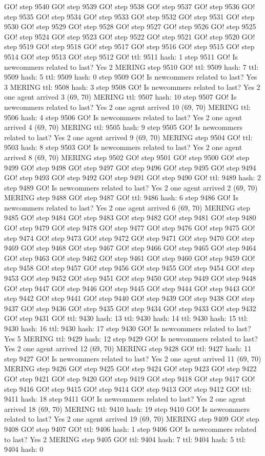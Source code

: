 GO! step 9540 GO! step 9539 GO! step 9538 GO! step 9537 GO! step 9536 GO! step 9535 GO! step 9534 GO! step 9533 GO! step 9532 GO! step 9531 GO! step 9530 GO! step 9529 GO! step 9528 GO! step 9527 GO! step 9526 GO! step 9525 GO! step 9524 GO! step 9523 GO! step 9522 GO! step 9521 GO! step 9520 GO! step 9519 GO! step 9518 GO! step 9517 GO! step 9516 GO! step 9515 GO! step 9514 GO! step 9513 GO! step 9512 GO! ttl: 9511 hash: 1 step 9511 GO! Is newcommers related to last? Yes 2 MERING step 9510 GO! ttl: 9509 hash: 7 ttl: 9509 hash: 5 ttl: 9509 hash: 0 step 9509 GO! Is newcommers related to last? Yes 3 MERING ttl: 9508 hash: 3 step 9508 GO! Is newcommers related to last? Yes 2 one agent arrived 3 (69, 70) MERING ttl: 9507 hash: 10 step 9507 GO! Is newcommers related to last? Yes 2 one agent arrived 10 (69, 70) MERING ttl: 9506 hash: 4 step 9506 GO! Is newcommers related to last? Yes 2 one agent arrived 4 (69, 70) MERING ttl: 9505 hash: 9 step 9505 GO! Is newcommers related to last? Yes 2 one agent arrived 9 (69, 70) MERING step 9504 GO! ttl: 9503 hash: 8 step 9503 GO! Is newcommers related to last? Yes 2 one agent arrived 8 (69, 70) MERING step 9502 GO! step 9501 GO! step 9500 GO! step 9499 GO! step 9498 GO! step 9497 GO! step 9496 GO! step 9495 GO! step 9494 GO! step 9493 GO! step 9492 GO! step 9491 GO! step 9490 GO! ttl: 9489 hash: 2 step 9489 GO! Is newcommers related to last? Yes 2 one agent arrived 2 (69, 70) MERING step 9488 GO! step 9487 GO! ttl: 9486 hash: 6 step 9486 GO! Is newcommers related to last? Yes 2 one agent arrived 6 (69, 70) MERING step 9485 GO! step 9484 GO! step 9483 GO! step 9482 GO! step 9481 GO! step 9480 GO! step 9479 GO! step 9478 GO! step 9477 GO! step 9476 GO! step 9475 GO! step 9474 GO! step 9473 GO! step 9472 GO! step 9471 GO! step 9470 GO! step 9469 GO! step 9468 GO! step 9467 GO! step 9466 GO! step 9465 GO! step 9464 GO! step 9463 GO! step 9462 GO! step 9461 GO! step 9460 GO! step 9459 GO! step 9458 GO! step 9457 GO! step 9456 GO! step 9455 GO! step 9454 GO! step 9453 GO! step 9452 GO! step 9451 GO! step 9450 GO! step 9449 GO! step 9448 GO! step 9447 GO! step 9446 GO! step 9445 GO! step 9444 GO! step 9443 GO! step 9442 GO! step 9441 GO! step 9440 GO! step 9439 GO! step 9438 GO! step 9437 GO! step 9436 GO! step 9435 GO! step 9434 GO! step 9433 GO! step 9432 GO! step 9431 GO! ttl: 9430 hash: 13 ttl: 9430 hash: 14 ttl: 9430 hash: 15 ttl: 9430 hash: 16 ttl: 9430 hash: 17 step 9430 GO! Is newcommers related to last? Yes 5 MERING ttl: 9429 hash: 12 step 9429 GO! Is newcommers related to last? Yes 2 one agent arrived 12 (69, 70) MERING step 9428 GO! ttl: 9427 hash: 11 step 9427 GO! Is newcommers related to last? Yes 2 one agent arrived 11 (69, 70) MERING step 9426 GO! step 9425 GO! step 9424 GO! step 9423 GO! step 9422 GO! step 9421 GO! step 9420 GO! step 9419 GO! step 9418 GO! step 9417 GO! step 9416 GO! step 9415 GO! step 9414 GO! step 9413 GO! step 9412 GO! ttl: 9411 hash: 18 step 9411 GO! Is newcommers related to last? Yes 2 one agent arrived 18 (69, 70) MERING ttl: 9410 hash: 19 step 9410 GO! Is newcommers related to last? Yes 2 one agent arrived 19 (69, 70) MERING step 9409 GO! step 9408 GO! step 9407 GO! ttl: 9406 hash: 1 step 9406 GO! Is newcommers related to last? Yes 2 MERING step 9405 GO! ttl: 9404 hash: 7 ttl: 9404 hash: 5 ttl: 9404 hash: 0 